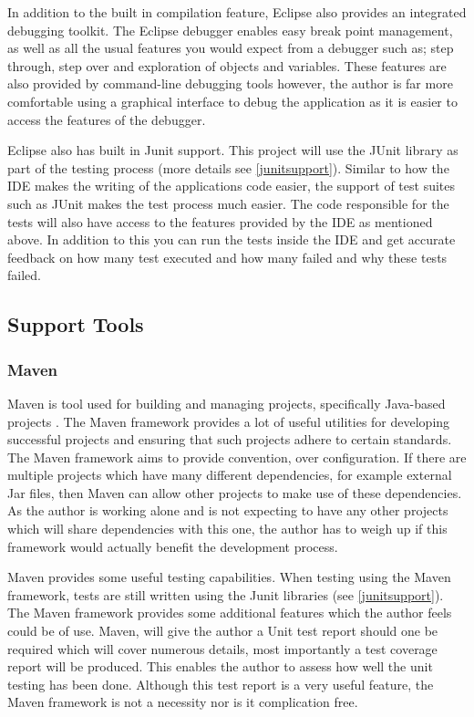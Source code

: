 In addition to the built in compilation feature, Eclipse also provides an integrated debugging toolkit. The Eclipse debugger enables easy break point management, as well as all the usual features you would expect from a debugger such as; step through, step over and exploration of objects and variables. These features are also provided by command-line debugging tools however, the author is far more comfortable using a graphical interface to debug the application as it is easier to access the features of the debugger.

Eclipse also has built in Junit support. This project will use the JUnit library as part of the testing process (more details see \ref{junitsupport}). Similar to how the IDE makes the writing of the applications code easier, the support of test suites such as JUnit makes the test process much easier. The code responsible for the tests will also have access to the features provided by the IDE as mentioned above. In addition to this you can run the tests inside the IDE and get accurate feedback on how many test executed and how many failed and why these tests failed.

\subsection{Support Tools}

\subsubsection{Maven}

Maven is tool used for building and managing projects, specifically Java-based projects \cite{maven:site}. The Maven framework provides a lot of useful utilities for developing successful projects and ensuring that such projects adhere to certain standards. The Maven framework aims to provide convention, over configuration. If there are multiple projects which have many different dependencies, for example external Jar files, then Maven can allow other projects to make use of these dependencies. As the author is working alone and is not expecting to have any other projects which will share dependencies with this one, the author has to weigh up if this framework would actually benefit the development process.

Maven provides some useful testing capabilities. When testing using the Maven framework, tests are still written using the Junit libraries (see \ref{junitsupport}). The Maven framework provides some additional features which the author feels could be of use. Maven, will give the author a Unit test report should one be required which will cover numerous details, most importantly a test coverage report will be produced. This enables the author to assess how well the unit testing has been done. Although this test report is a very useful feature, the Maven framework is not a necessity nor is it complication free.

